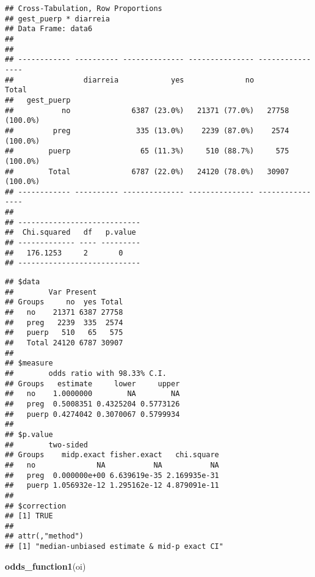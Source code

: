 \documentclass[
]{article}
\newenvironment{Shaded}{\begin{snugshade}}{\end{snugshade}}
\newcommand{\KeywordTok}[1]{\textcolor[rgb]{0.13,0.29,0.53}{\textbf{#1}}}
\newcommand{\NormalTok}[1]{#1}
\newcommand{\OperatorTok}[1]{\textcolor[rgb]{0.81,0.36,0.00}{\textbf{#1}}}
\newcommand{\StringTok}[1]{\textcolor[rgb]{0.31,0.60,0.02}{#1}}
\begin{document}
\begin{verbatim}
## Cross-Tabulation, Row Proportions  
## gest_puerp * diarreia  
## Data Frame: data6  
## 
## 
## ------------ ---------- -------------- --------------- ----------------
##                diarreia            yes              no            Total
##   gest_puerp                                                           
##           no              6387 (23.0%)   21371 (77.0%)   27758 (100.0%)
##         preg               335 (13.0%)    2239 (87.0%)    2574 (100.0%)
##        puerp                65 (11.3%)     510 (88.7%)     575 (100.0%)
##        Total              6787 (22.0%)   24120 (78.0%)   30907 (100.0%)
## ------------ ---------- -------------- --------------- ----------------
## 
## ----------------------------
##  Chi.squared   df   p.value 
## ------------- ---- ---------
##   176.1253     2       0    
## ----------------------------
\end{verbatim}

\begin{Shaded}
\end{Shaded}

\begin{verbatim}
## $data
##        Var Present
## Groups     no  yes Total
##   no    21371 6387 27758
##   preg   2239  335  2574
##   puerp   510   65   575
##   Total 24120 6787 30907
## 
## $measure
##        odds ratio with 98.33% C.I.
## Groups   estimate     lower     upper
##   no    1.0000000        NA        NA
##   preg  0.5008351 0.4325204 0.5773126
##   puerp 0.4274042 0.3070067 0.5799934
## 
## $p.value
##        two-sided
## Groups    midp.exact fisher.exact   chi.square
##   no              NA           NA           NA
##   preg  0.000000e+00 6.639619e-35 2.169935e-31
##   puerp 1.056932e-12 1.295162e-12 4.879091e-11
## 
## $correction
## [1] TRUE
## 
## attr(,"method")
## [1] "median-unbiased estimate & mid-p exact CI"
\end{verbatim}

\begin{Shaded}
\begin{Highlighting}[]
\KeywordTok{odds_function1}\NormalTok{(oi)}
\end{Highlighting}
\end{Shaded}
\end{document}

